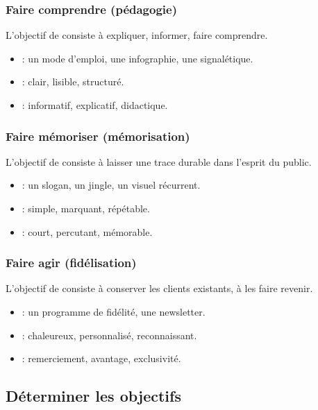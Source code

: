 \subsubsection{Faire comprendre (pédagogie)}

L'objectif de  consiste à expliquer, informer, faire comprendre.

\begin{itemize}
    \item {} : un mode d'emploi, une infographie, une signalétique.
    \item {} : clair, lisible, structuré.
    \item {} : informatif, explicatif, didactique.
\end{itemize}

\subsubsection{Faire mémoriser (mémorisation)}

L'objectif de  consiste à laisser une trace durable dans l'esprit du public.

\begin{itemize}
    \item {} : un slogan, un jingle, un visuel récurrent.
    \item {} : simple, marquant, répétable.
    \item {} : court, percutant, mémorable.
\end{itemize}

\subsubsection{Faire agir (fidélisation)}

L'objectif de  consiste à conserver les clients existants, à les faire revenir.

\begin{itemize}
    \item {} : un programme de fidélité, une newsletter.
    \item {} : chaleureux, personnalisé, reconnaissant.
    \item {} : remerciement, avantage, exclusivité.
\end{itemize}

\subsection{Déterminer les objectifs}

